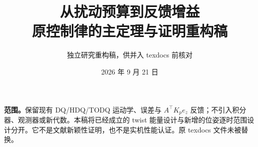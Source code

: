 \documentclass[11pt,a4paper]{article}
\title{从扰动预算到反馈增益\\原控制律的主定理与证明重构稿}
\author{独立研究重构稿，供并入 texdocs 前核对}
\date{2026 年 9 月 21 日}
\begin{document}
\maketitle
\noindent\textbf{范围。}保留现有 DQ/HDQ/TODQ 运动学、误差与 $A^\top K_pe_z$ 反馈；不引入积分器、观测器或新代数。本稿将已经成立的 twist 能量设计与新增的位姿逐时范围设计分开。它不是文献新颖性证明，也不是实机性能认证。原 texdocs 文件未被替换。

\end{document}

